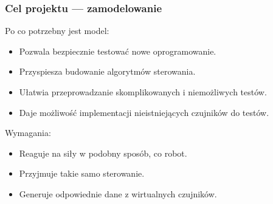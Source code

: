 \documentclass{beamer}
\begin{document}
	\begin{frame}
		\frametitle{Cel projektu --- zamodelowanie}
		Po co potrzebny jest model:
		\begin{itemize}
		 \item Pozwala bezpiecznie testować nowe oprogramowanie.
		 \item Przyspiesza budowanie algorytmów sterowania.
		 \item Ułatwia przeprowadzanie skomplikowanych i niemożliwych testów.
		 \item Daje możliwość implementacji nieistniejących czujników do testów.
		\end{itemize}
		Wymagania:
		\begin{itemize}
		 \item Reaguje na siły w podobny sposób, co robot.
		 \item Przyjmuje takie samo sterowanie.
		 \item Generuje odpowiednie dane z wirtualnych czujników.
		\end{itemize}
	\end{frame}
	
\end{document}
